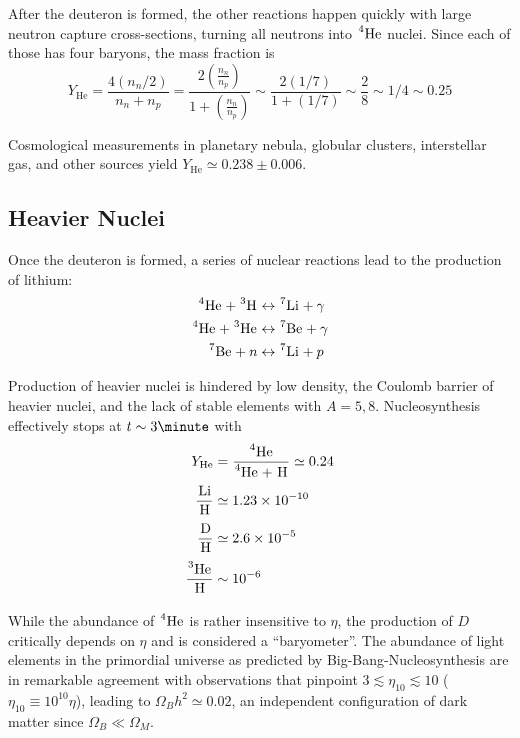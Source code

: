 \documentclass[a4paper,twoside,master.tex]{subfiles}
\begin{document}

After the deuteron is formed, the other reactions happen quickly with large neutron capture cross-sections, turning all neutrons into $ \nuclide[4]{He} $ nuclei. Since each of those has four baryons, the mass fraction is
\begin{equation}
    Y_{\text{He}} = \frac{4 (n_n / 2)}{n_n + n_p} = \frac{2 \left( \frac{n_n}{n_p} \right)}{1 + \left( \frac{n_n}{n_p} \right)} \sim \frac{2 \left( 1/7 \right)}{1 + \left( 1/7 \right)} \sim \frac{2}{8} \sim 1/4 \sim 0.25
\end{equation}

Cosmological measurements in planetary nebula, globular clusters, interstellar gas, and other sources yield $ Y_{\text{He}} \simeq 0.238\pm 0.006 $.

\subsection{Heavier Nuclei}\label{sub:heavier_nuclei}

Once the deuteron is formed, a series of nuclear reactions lead to the production of lithium:
\begin{align}
    \nuclide[4]{He} + \nuclide[3]{H} &\leftrightarrow \nuclide[7]{Li} + \gamma \\
    \nuclide[4]{He} + \nuclide[3]{He} &\leftrightarrow \nuclide[7]{Be} + \gamma \\
    \nuclide[7]{Be} + n &\leftrightarrow \nuclide[7]{Li} + p
\end{align}

Production of heavier nuclei is hindered by low density, the Coulomb barrier of heavier nuclei, and the lack of stable elements with $ A = 5, 8 $. Nucleosynthesis effectively stops at $ t \sim 3\minute $ with
\begin{align}
    Y_{\text{He}} &= \frac{\nuclide[4]{He}}{\nuclide[4]{He} + \nuclide{H}} \simeq 0.24 \\
    \frac{\nuclide{Li}}{\nuclide{H}} &\simeq 1.23 \times 10^{-10} \\
    \frac{\nuclide{D}}{\nuclide{H}} &\simeq 2.6 \times 10^{-5} \\
    \frac{\nuclide[3]{He}}{\nuclide{H}} &\sim 10^{-6} 
\end{align}

While the abundance of $ \nuclide[4]{He} $ is rather insensitive to $ \eta $, the production of $ D $ critically depends on $ \eta $ and is considered a ``baryometer''. The abundance of light elements in the primordial universe as predicted by Big-Bang-Nucleosynthesis are in remarkable agreement with observations that pinpoint $ 3 \lesssim \eta_{10} \lesssim 10 $ ($ \eta_{10} \equiv 10^{10} \eta $), leading to $ \Omega_B h^2 \simeq 0.02 $, an independent configuration of dark matter since $ \Omega_B \ll \Omega_M $. 
\end{document}
